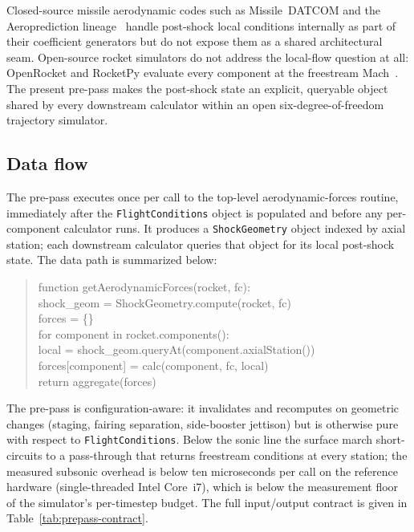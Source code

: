 Closed-source missile aerodynamic codes such as Missile~DATCOM and the
Aeroprediction lineage~\cite{sooy2005,moore2001,mooremcinvillehymer2002} handle
post-shock local conditions internally as part of their coefficient generators
but do not expose them as a shared architectural seam. Open-source rocket
simulators do not address the local-flow question at all: OpenRocket and
RocketPy evaluate every component at the freestream
Mach~\cite{niskanen2009,rocketpy2021}. The present pre-pass makes the
post-shock state an explicit, queryable object shared by every downstream
calculator within an open six-degree-of-freedom trajectory simulator.

\subsection{Data flow}
\label{subsec:prepass-dataflow}

The pre-pass executes once per call to the top-level aerodynamic-forces routine,
immediately after the \texttt{FlightConditions} object is populated and before
any per-component calculator runs. It produces a \texttt{ShockGeometry} object
indexed by axial station; each downstream calculator queries that object for its
local post-shock state. The data path is summarized below:

\begin{quote}
\ttfamily\small
function getAerodynamicForces(rocket, fc):\\
\hspace*{1.5em} shock\_geom = ShockGeometry.compute(rocket, fc)\\
\hspace*{1.5em} forces = \{\}\\
\hspace*{1.5em} for component in rocket.components():\\
\hspace*{3.0em} local = shock\_geom.queryAt(component.axialStation())\\
\hspace*{3.0em} forces[component] = calc(component, fc, local)\\
\hspace*{1.5em} return aggregate(forces)
\end{quote}

The pre-pass is configuration-aware: it invalidates and recomputes on geometric
changes (staging, fairing separation, side-booster jettison) but is otherwise
pure with respect to \texttt{FlightConditions}. Below the sonic line the surface
march short-circuits to a pass-through that returns freestream conditions at
every station; the measured subsonic overhead is below ten microseconds per call
on the reference hardware (single-threaded Intel Core~i7), which is below the
measurement floor of the simulator's per-timestep budget. The full
input/output contract is given in Table~\ref{tab:prepass-contract}.

